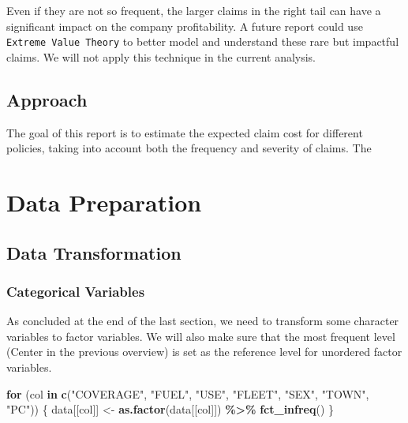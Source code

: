 \documentclass[
  english,
  11pt,
]{article}
\newenvironment{Shaded}{\begin{snugshade}}{\end{snugshade}}
\newcommand{\ControlFlowTok}[1]{\textcolor[rgb]{0.13,0.29,0.53}{\textbf{#1}}}
\newcommand{\FunctionTok}[1]{\textcolor[rgb]{0.13,0.29,0.53}{\textbf{#1}}}
\newcommand{\NormalTok}[1]{#1}
\newcommand{\OtherTok}[1]{\textcolor[rgb]{0.56,0.35,0.01}{#1}}
\newcommand{\SpecialCharTok}[1]{\textcolor[rgb]{0.81,0.36,0.00}{\textbf{#1}}}
\newcommand{\StringTok}[1]{\textcolor[rgb]{0.31,0.60,0.02}{#1}}
\begin{document}
Even if they are not so frequent, the larger claims in the right tail
can have a significant impact on the company profitability. A future
report could use \texttt{Extreme\ Value\ Theory} to better model and
understand these rare but impactful claims. We will not apply this
technique in the current analysis.

\subsection{Approach}\label{approach}

The goal of this report is to estimate the expected claim cost for
different policies, taking into account both the frequency and severity
of claims. The

\section{Data Preparation}\label{data-preparation}

\subsection{Data Transformation}\label{data-transformation}

\subsubsection{Categorical Variables}\label{categorical-variables}

As concluded at the end of the last section, we need to transform some
character variables to factor variables. We will also make sure that the
most frequent level (Center in the previous overview) is set as the
reference level for unordered factor variables.

\begin{Shaded}
\begin{Highlighting}[]
\ControlFlowTok{for}\NormalTok{ (col }\ControlFlowTok{in} \FunctionTok{c}\NormalTok{(}\StringTok{"COVERAGE"}\NormalTok{, }\StringTok{"FUEL"}\NormalTok{, }\StringTok{"USE"}\NormalTok{, }\StringTok{"FLEET"}\NormalTok{, }\StringTok{"SEX"}\NormalTok{, }\StringTok{"TOWN"}\NormalTok{, }\StringTok{"PC"}\NormalTok{)) \{}
\NormalTok{    data[[col]] }\OtherTok{\textless{}{-}} \FunctionTok{as.factor}\NormalTok{(data[[col]]) }\SpecialCharTok{\%\textgreater{}\%} \FunctionTok{fct\_infreq}\NormalTok{()}
\NormalTok{\}}
\end{Highlighting}
\end{Shaded}
\end{document}
